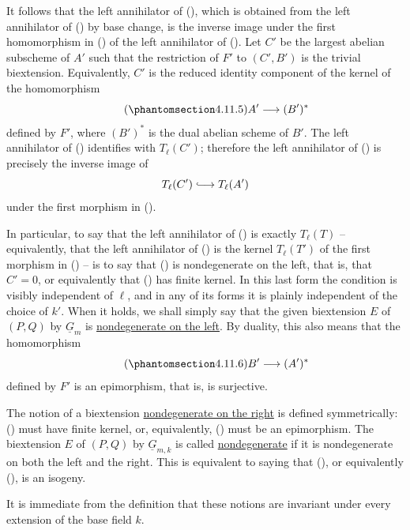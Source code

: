 It follows that the left annihilator of (), which is obtained
from the left annihilator of () by base change, is the inverse
image under the first homomorphism in () of the left
annihilator of ().  Let $C'$ be the largest abelian subscheme
of $A'$ such that the restriction of $F'$ to $(C',B')$ is the
trivial biextension.  Equivalently, $C'$ is the reduced identity
component of the kernel of the homomorphism
\begin{equation}\tag{\SGARefTarget{sga7.sga7i.eviii.n4-11-5}{4.11.5}}
 A'\longrightarrow (B')^*
\end{equation}
defined by $F'$, where $(B')^*$ is the dual abelian scheme of $B'$.
The left annihilator of () identifies with $T_\ell(C')$;
therefore the left annihilator of () is precisely the inverse
image of
\[
 T_\ell(C')\lhook\joinrel\longrightarrow T_\ell(A')
\]
under the first morphism in ().

In particular, to say that the left annihilator of () is
exactly $T_\ell(T)$ -- equivalently, that the left annihilator of
() is the kernel $T_\ell(T')$ of the first morphism in
() -- is to say that () is nondegenerate on the left,
that is, that $C'=0$, or equivalently that () has finite
kernel.  In this last form the condition is visibly independent of
$\ell$, and in any of its forms it is plainly independent of the
choice of $k'$.  When it holds, we shall simply say that the given
biextension $E$ of $(P,Q)$ by $\underline G_m$ is
\underline{nondegenerate on the left}.  By duality, this also means
that the homomorphism
\begin{equation}\tag{\SGARefTarget{sga7.sga7i.eviii.n4-11-6}{4.11.6}}
 B'\longrightarrow (A')^*
\end{equation}
defined by $F'$ is an epimorphism, that is, is surjective.

The notion of a biextension \underline{nondegenerate on the right}
is defined symmetrically: () must have finite kernel, or,
equivalently, () must be an epimorphism.  The biextension $E$
of $(P,Q)$ by $\underline G_{m,k}$ is called
\underline{nondegenerate} if it is nondegenerate on both the left
and the right.  This is equivalent to saying that (), or
equivalently (), is an isogeny.

It is immediate from the definition that these notions are
invariant under every extension of the base field $k$.
